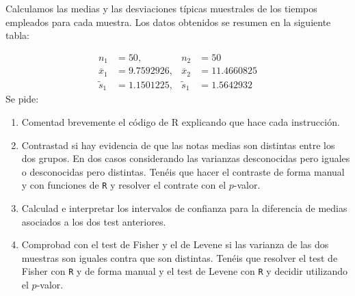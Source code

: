 \documentclass[
]{article}
\newenvironment{Shaded}{\begin{snugshade}}{\end{snugshade}}
\newcommand{\DataTypeTok}[1]{\textcolor[rgb]{0.13,0.29,0.53}{#1}}
\newcommand{\KeywordTok}[1]{\textcolor[rgb]{0.13,0.29,0.53}{\textbf{#1}}}
\newcommand{\NormalTok}[1]{#1}
\newcommand{\OperatorTok}[1]{\textcolor[rgb]{0.81,0.36,0.00}{\textbf{#1}}}
\newcommand{\OtherTok}[1]{\textcolor[rgb]{0.56,0.35,0.01}{#1}}
\newcommand{\StringTok}[1]{\textcolor[rgb]{0.31,0.60,0.02}{#1}}
\providecommand{\tightlist}{%
  \setlength{\itemsep}{0pt}\setlength{\parskip}{0pt}}
\begin{document}
\begin{Shaded}
\end{Shaded}

Calculamos las medias y las desviaciones típicas muestrales de los
tiempos empleados para cada muestra. Los datos obtenidos se resumen en
la siguiente tabla:

\[
\begin{array}{llll}
n_1&=50, & n_2&=50\\
\overline{x}_1&=9.7592926, & \overline{x}_2&=11.4660825\\
\tilde{s}_1&=1.1501225, & \tilde{s}_1&=1.5642932
\end{array}
\] Se pide:

\begin{enumerate}
\def\labelenumi{\arabic{enumi}.}
\tightlist
\item
  Comentad brevemente el código de R explicando que hace cada
  instrucción.
\item
  Contrastad si hay evidencia de que las notas medias son distintas
  entre los dos grupos. En dos casos considerando las varianzas
  desconocidas pero iguales o desconocidas pero distintas. Tenéis que
  hacer el contraste de forma manual y con funciones de \texttt{R} y
  resolver el contrate con el \(p\)-valor.
\item
  Calculad e interpretar los intervalos de confianza para la diferencia
  de medias asociados a los dos test anteriores.
\item
  Comprobad con el test de Fisher y el de Levene si las varianza de las
  dos muestras son iguales contra que son distintas. Tenéis que resolver
  el test de Fisher con \texttt{R} y de forma manual y el test de Levene
  con \texttt{R} y decidir utilizando el \(p\)-valor.
\end{enumerate}
\end{document}
